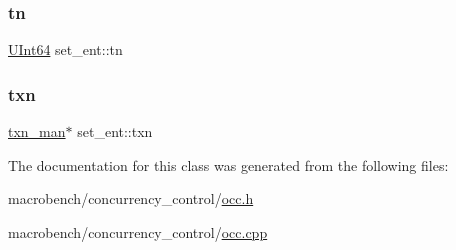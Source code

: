 \subsubsection{\texorpdfstring{tn}{tn}}
{\footnotesize\ttfamily \hyperlink{global_8h_aa288382a207683aa38aca516f6edd66d}{U\+Int64} set\+\_\+ent\+::tn}

\mbox{\label{classset__ent_aa2178fabde4bb9173ffb05611637e8ee}} 
\subsubsection{\texorpdfstring{txn}{txn}}
{\footnotesize\ttfamily \hyperlink{classtxn__man}{txn\+\_\+man}$\ast$ set\+\_\+ent\+::txn}



The documentation for this class was generated from the following files\+:\begin{DoxyCompactItemize}
\item 
macrobench/concurrency\+\_\+control/\hyperlink{occ_8h}{occ.\+h}\item 
macrobench/concurrency\+\_\+control/\hyperlink{occ_8cpp}{occ.\+cpp}\end{DoxyCompactItemize}
